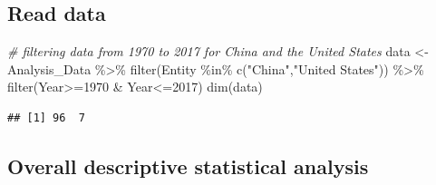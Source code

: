 \documentclass[11pt,a4paper,]{article}
\newenvironment{Shaded}{\begin{snugshade}}{\end{snugshade}}
\newcommand{\CommentTok}[1]{\textcolor[rgb]{0.56,0.35,0.01}{\textit{#1}}}
\newcommand{\DecValTok}[1]{\textcolor[rgb]{0.00,0.00,0.81}{#1}}
\newcommand{\FunctionTok}[1]{\textcolor[rgb]{0.00,0.00,0.00}{#1}}
\newcommand{\NormalTok}[1]{#1}
\newcommand{\OtherTok}[1]{\textcolor[rgb]{0.56,0.35,0.01}{#1}}
\newcommand{\SpecialCharTok}[1]{\textcolor[rgb]{0.00,0.00,0.00}{#1}}
\newcommand{\StringTok}[1]{\textcolor[rgb]{0.31,0.60,0.02}{#1}}
\begin{document}
\hypertarget{read-data}{%
\subsection{Read data}\label{read-data}}

\begin{Shaded}
\begin{Highlighting}[]
\CommentTok{\# filtering data from 1970 to 2017 for China and the United States}
\NormalTok{data }\OtherTok{\textless{}{-}}\NormalTok{ Analysis\_Data }\SpecialCharTok{\%\textgreater{}\%}
  \FunctionTok{filter}\NormalTok{(Entity }\SpecialCharTok{\%in\%} \FunctionTok{c}\NormalTok{(}\StringTok{"China"}\NormalTok{,}\StringTok{"United States"}\NormalTok{)) }\SpecialCharTok{\%\textgreater{}\%}
  \FunctionTok{filter}\NormalTok{(Year}\SpecialCharTok{\textgreater{}=}\DecValTok{1970} \SpecialCharTok{\&}\NormalTok{ Year}\SpecialCharTok{\textless{}=}\DecValTok{2017}\NormalTok{)}
\FunctionTok{dim}\NormalTok{(data)}
\end{Highlighting}
\end{Shaded}

\begin{verbatim}
## [1] 96  7
\end{verbatim}

\hypertarget{overall-descriptive-statistical-analysis}{%
\subsection{Overall descriptive statistical analysis}\label{overall-descriptive-statistical-analysis}}
\end{document}
